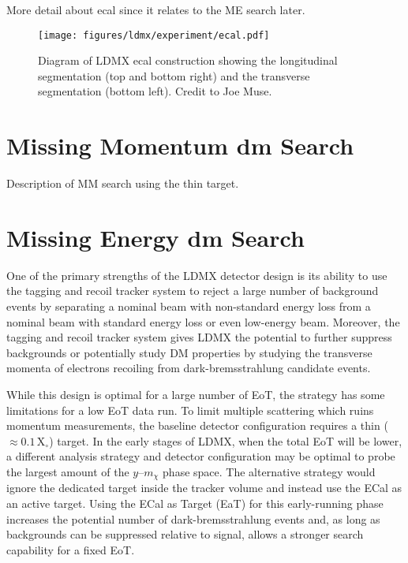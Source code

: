 More detail about \gls{ecal} since it relates to the ME search later.

\begin{figure}
    \centering
    \texttt{[image: figures/ldmx/experiment/ecal.pdf]}
    \caption{
        Diagram of LDMX \gls{ecal} construction showing the longitudinal segmentation
        (top and bottom right) and the transverse segmentation (bottom left).
        Credit to Joe Muse.
    }
    \label{fig:ldmx-ecal}
\end{figure}

\section{Missing Momentum \gls{dm} Search}

Description of MM search using the thin target.

\section{Missing Energy \gls{dm} Search}
One of the primary strengths of the LDMX detector design is its ability to use the tagging and recoil tracker system to reject a large number of background events by separating a nominal beam with non-standard energy loss from a nominal beam with standard energy loss or even low-energy beam. Moreover, the tagging and recoil tracker system gives LDMX the potential to further suppress backgrounds or potentially study DM properties by studying the transverse momenta of electrons recoiling from dark-bremsstrahlung candidate events.

While this design is optimal for a large number of EoT, the strategy has some limitations for a low EoT data run.  To limit multiple scattering which ruins momentum measurements, the baseline detector configuration requires a thin ($\approx 0.1 \,\mathrm{X}_\circ$) target. In the early stages of LDMX, when the total EoT will be lower, a different analysis strategy and detector configuration may be optimal to  probe the largest amount of the $y$--$m_\chi$ phase space.  The alternative strategy would ignore the dedicated target inside the tracker volume and instead use the ECal as an active target. Using the ECal as Target (EaT) for this early-running phase increases the potential number of dark-bremsstrahlung events and, as long as backgrounds can be suppressed relative to signal, allows a stronger search capability for a fixed EoT.


